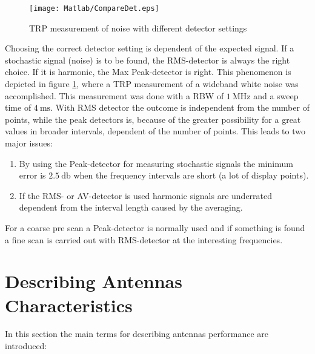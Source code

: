 \begin{figure}
\centering
\texttt{[image: Matlab/CompareDet.eps]}
\caption{TRP measurement of noise with different detector settings}
\label{fig:trpmeasnoise}
\end{figure}

Choosing the correct detector setting is dependent of the expected signal. If a stochastic signal (noise) is to be found, the \ac{RMS}-detector is always the right choice. If it is harmonic, the Max Peak-detector is right. This phenomenon is depicted in figure \ref{fig:trpmeasnoise}, where a \ac{TRP} measurement of a wideband white noise was accomplished. This measurement was done with a \ac{RBW} of $\SI{1}{\mega\hertz}$ and a sweep time of $\SI{4}{\milli\second}$. With \ac{RMS} detector the outcome is independent from the number of points, while the peak detectors is, because of the greater possibility for a great values in broader intervals, dependent of the number of points. This leads to two major issues:

\begin{enumerate}
\item By using the Peak-detector for measuring stochastic signals the minimum error is $\SI{2.5}{\decibel}$ when the frequency intervals are short (a lot of display points).
\item If the \ac{RMS}- or AV-detector is used harmonic signals are underrated dependent from the interval length caused by the averaging.
\end{enumerate} 

For a coarse pre scan a Peak-detector is normally used and if something is found a fine scan is carried out with \ac{RMS}-detector at the interesting frequencies.

\section{Describing Antennas Characteristics}

In this section the main terms for describing antennas performance are introduced: \cite{balanis}

